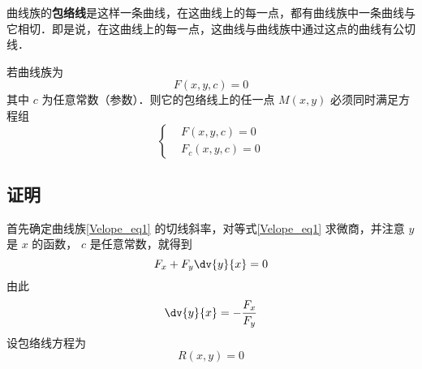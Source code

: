 
曲线族的\textbf{包络线}是这样一条曲线，在这曲线上的每一点，都有曲线族中一条曲线与它相切．即是说，在这曲线上的每一点，这曲线与曲线族中通过这点的曲线有公切线．

若曲线族为 
\begin{equation}\label{Velope_eq1}
F(x,y,c)=0
\end{equation}
其中 $c$ 为任意常数（参数）．则它的包络线上的任一点 $M(x,y)$ 必须同时满足方程组
\begin{equation}
\left\{\begin{aligned}
&F(x,y,c)=0\\
&F_c(x,y,c)=0
\end{aligned}\right.
\end{equation}
\subsection{证明}
首先确定曲线族\autoref{Velope_eq1} 的切线斜率，对等式\autoref{Velope_eq1} 求微商，并注意 $y$ 是 $x$ 的函数， $c$ 是任意常数，就得到
\begin{equation}
F_x+F_y\dv{y}{x}=0
\end{equation}
由此
\begin{equation}
\dv{y}{x}=-\frac{F_x}{F_y}
\end{equation}
设包络线方程为
\begin{equation}
R(x,y)=0
\end{equation}
